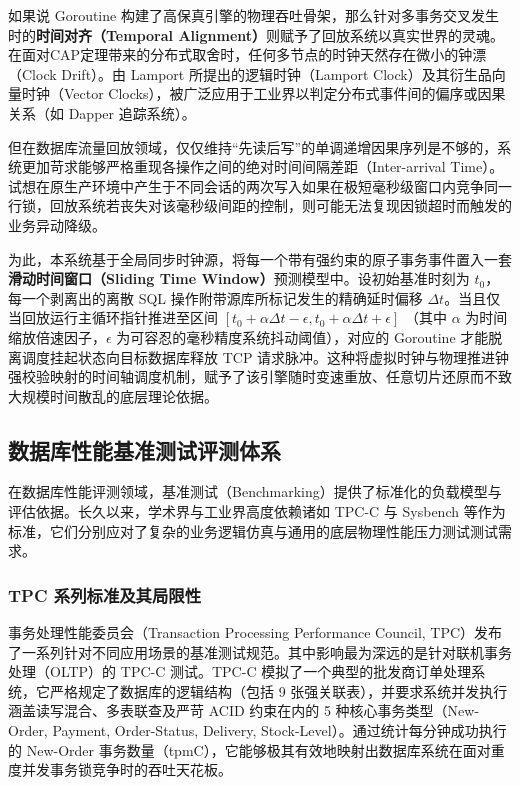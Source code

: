 如果说 Goroutine 构建了高保真引擎的物理吞吐骨架，那么针对多事务交叉发生时的\textbf{时间对齐（Temporal Alignment）}则赋予了回放系统以真实世界的灵魂。在面对CAP定理\cite{CAP}带来的分布式取舍时，任何多节点的时钟天然存在微小的钟漂（Clock Drift）。由 Lamport 所提出的逻辑时钟（Lamport Clock）\cite{LamportClock}及其衍生品向量时钟（Vector Clocks）\cite{VectorClock}，被广泛应用于工业界以判定分布式事件间的偏序或因果关系（如 Dapper\cite{Dapper} 追踪系统）。

但在数据库流量回放领域，仅仅维持“先读后写”的单调递增因果序列是不够的，系统更加苛求能够严格重现各操作之间的绝对时间间隔差距（Inter-arrival Time）。试想在原生产环境中产生于不同会话的两次写入如果在极短毫秒级窗口内竞争同一行锁，回放系统若丧失对该毫秒级间距的控制，则可能无法复现因锁超时而触发的业务异动降级。

为此，本系统基于全局同步时钟源，将每一个带有强约束的原子事务事件置入一套\textbf{滑动时间窗口（Sliding Time Window）}预测模型中。设初始基准时刻为 $t_0$，每一个剥离出的离散 SQL 操作附带源库所标记发生的精确延时偏移 $\Delta t$。当且仅当回放运行主循环指针推进至区间 $[t_0 + \alpha\Delta t - \epsilon, t_0 + \alpha\Delta t + \epsilon]$ （其中 $\alpha$ 为时间缩放倍速因子，$\epsilon$ 为可容忍的毫秒精度系统抖动阈值），对应的 Goroutine 才能脱离调度挂起状态向目标数据库释放 TCP 请求脉冲。这种将虚拟时钟与物理推进钟强校验映射的时间轴调度机制，赋予了该引擎随时变速重放、任意切片还原而不致大规模时间散乱的底层理论依据。

\subsection{数据库性能基准测试评测体系}

在数据库性能评测领域，基准测试（Benchmarking）提供了标准化的负载模型与评估依据。长久以来，学术界与工业界高度依赖诸如 TPC-C\cite{TPC-C} 与 Sysbench\cite{sysbench} 等作为标准，它们分别应对了复杂的业务逻辑仿真与通用的底层物理性能压力测试测试需求。

\subsubsection{TPC 系列标准及其局限性}

事务处理性能委员会（Transaction Processing Performance Council, TPC）发布了一系列针对不同应用场景的基准测试规范。其中影响最为深远的是针对联机事务处理（OLTP）的 TPC-C 测试。TPC-C 模拟了一个典型的批发商订单处理系统，它严格规定了数据库的逻辑结构（包括 9 张强关联表），并要求系统并发执行涵盖读写混合、多表联查及严苛 ACID 约束在内的 5 种核心事务类型（New-Order, Payment, Order-Status, Delivery, Stock-Level）。通过统计每分钟成功执行的 New-Order 事务数量（tpmC），它能够极其有效地映射出数据库系统在面对重度并发事务锁竞争时的吞吐天花板。

